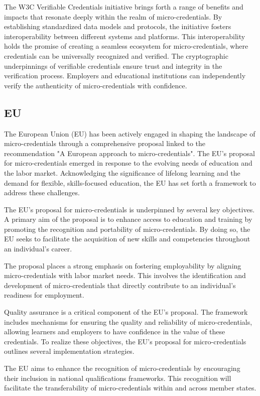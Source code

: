 \documentclass{article}
\begin{document}
\begin{multicols}{2}
    The W3C Verifiable Credentials initiative brings forth a range of benefits and impacts that resonate deeply within the realm of micro-credentials. By establishing standardized data models and protocols, the initiative fosters interoperability between different systems and platforms. This interoperability holds the promise of creating a seamless ecosystem for micro-credentials, where credentials can be universally recognized and verified. The cryptographic underpinnings of verifiable credentials ensure trust and integrity in the verification process. Employers and educational institutions can independently verify the authenticity of micro-credentials with confidence.

    \subsection{EU}
    The European Union (EU) has been actively engaged in shaping the landscape of micro-credentials through a comprehensive proposal linked to the recommendation "A European approach to micro-credentials". The EU's proposal for micro-credentials emerged in response to the evolving needs of education and the labor market. Acknowledging the significance of lifelong learning and the demand for flexible, skills-focused education, the EU has set forth a framework to address these challenges.

    The EU's proposal for micro-credentials is underpinned by several key objectives. A primary aim of the proposal is to enhance access to education and training by promoting the recognition and portability of micro-credentials. By doing so, the EU seeks to facilitate the acquisition of new skills and competencies throughout an individual's career.

    The proposal places a strong emphasis on fostering employability by aligning micro-credentials with labor market needs. This involves the identification and development of micro-credentials that directly contribute to an individual's readiness for employment.

    Quality assurance is a critical component of the EU's proposal. The framework includes mechanisms for ensuring the quality and reliability of micro-credentials, allowing learners and employers to have confidence in the value of these credentials. To realize these objectives, the EU's proposal for micro-credentials outlines several implementation strategies.

    The EU aims to enhance the recognition of micro-credentials by encouraging their inclusion in national qualifications frameworks. This recognition will facilitate the transferability of micro-credentials within and across member states.


\end{multicols}
\end{document}

